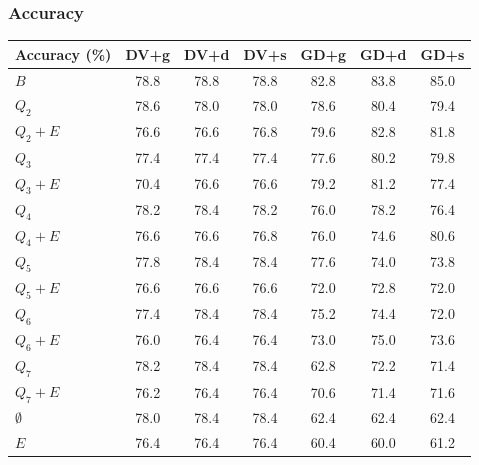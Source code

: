 \documentclass{beamer}
\begin{document}
\begin{frame}
  \frametitle{Accuracy}
  \footnotesize
  \begin{table}[h]
    \centering
    \begin{tabular}{l|c|c|c|c|c|c}
      \hline
      \multicolumn{1}{c}{\bfseries Accuracy (\%)} & \multicolumn{1}{c}{\bfseries DV+g} &
      \multicolumn{1}{c}{\bfseries DV+d} & \multicolumn{1}{c}{\bfseries DV+s} &
      \multicolumn{1}{c}{\bfseries GD+g} & \multicolumn{1}{c}{\bfseries GD+d} &
      \multicolumn{1}{c}{\bfseries GD+s}\\
      \hline
      $B$         & 78.8 & 78.8 & 78.8 & 82.8 & 83.8 & 85.0\\
      $Q_2$       & 78.6 & 78.0 & 78.0 & 78.6 & 80.4 & 79.4\\
      $Q_2+E$     & 76.6 & 76.6 & 76.8 & 79.6 & 82.8 & 81.8\\
      $Q_3$       & 77.4 & 77.4 & 77.4 & 77.6 & 80.2 & 79.8\\
      $Q_3+E$     & 70.4 & 76.6 & 76.6 & 79.2 & 81.2 & 77.4\\
      $Q_4$       & 78.2 & 78.4 & 78.2 & 76.0 & 78.2 & 76.4\\
      $Q_4+E$     & 76.6 & 76.6 & 76.8 & 76.0 & 74.6 & 80.6\\
      $Q_5$       & 77.8 & 78.4 & 78.4 & 77.6 & 74.0 & 73.8\\
      $Q_5+E$     & 76.6 & 76.6 & 76.6 & 72.0 & 72.8 & 72.0\\
      $Q_6$       & 77.4 & 78.4 & 78.4 & 75.2 & 74.4 & 72.0\\
      $Q_6+E$     & 76.0 & 76.4 & 76.4 & 73.0 & 75.0 & 73.6\\
      $Q_7$       & 78.2 & 78.4 & 78.4 & 62.8 & 72.2 & 71.4\\
      $Q_7+E$     & 76.2 & 76.4 & 76.4 & 70.6 & 71.4 & 71.6\\
      $\emptyset$ & 78.0 & 78.4 & 78.4 & 62.4 & 62.4 & 62.4\\
      $E$         & 76.4 & 76.4 & 76.4 & 60.4 & 60.0 & 61.2\\
    \end{tabular}
  \end{table}
\end{frame}
\end{document}
